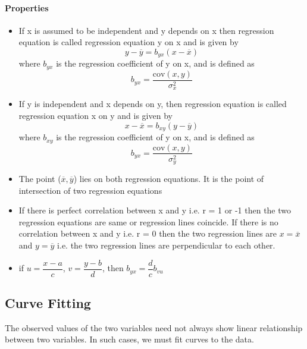 \documentclass[
10pt, %
a4paper, %
]{report}
\begin{document}
\paragraph*{Properties}
\begin{itemize}
\item If x is assumed to be independent and y depends on x then regression equation is called regression equation y on x and is given by
\[y - \overline{y} = b_{yx} (x - \overline{x})\]
where \(b_{yx}\) is the regression coefficient of y on x, and is defined as
\[b_{yx} = \frac{\mathrm{cov}(x, y)}{\sigma_x^2}\]
\item If y is independent and x depends on y, then regression equation is called regression equation x on y and is given by
\[x - \overline{x} = b_{xy} (y - \overline{y})\]
where \(b_{xy}\) is the regression coefficient of y on x, and is defined as
\[b_{yx} = \frac{\mathrm{cov}(x, y)}{\sigma_y^2}\]
\item The point (\(\overline{x}, \overline{y}\)) lies on both regression equations. It is the point of intersection of two regression equations
\item If there is perfect correlation between x and y i.e. r = 1 or -1 then the two regression equations are same or regression lines coincide. If there is no correlation between x and y i.e. r = 0 then the two regression lines are \(x = \overline{x}\) and \(y = \overline{y}\) i.e. the two regression lines are perpendicular to each other.
\item if \(u =\dfrac{x-a}{c}\), \(v = \dfrac{y-b}{d}\), then \(b_{yx} = \dfrac{d}{c} b_{vu}\)
\end{itemize}

\subsection{Curve Fitting}
The observed values of the two variables need not always show
linear relationship between two variables. In such cases, we must fit curves to the data.
\end{document}

